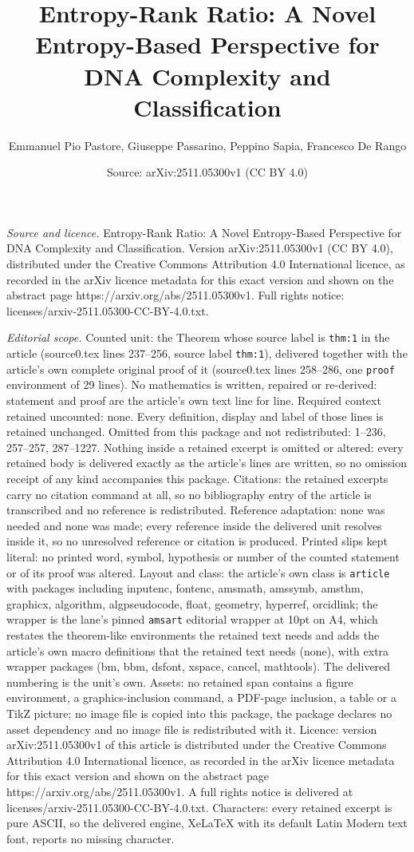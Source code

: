 \documentclass[10pt,a4paper]{amsart}
\title[Entropy-Rank Ratio: A Novel Entropy-Based Perspective for DN]{Entropy-Rank Ratio: A Novel Entropy-Based Perspective for DNA Complexity and Classification}
\author{Emmanuel Pio Pastore, Giuseppe Passarino, Peppino Sapia, Francesco De Rango}
\date{Source: arXiv:2511.05300v1 (CC BY 4.0)}
\begin{document}
\maketitle

\noindent\emph{Source and licence.} Entropy-Rank Ratio: A Novel Entropy-Based Perspective for DNA Complexity and Classification. Version arXiv:2511.05300v1 (CC BY 4.0), distributed under the Creative Commons Attribution 4.0 International licence, as recorded in the arXiv licence metadata for this exact version and shown on the abstract page https://arxiv.org/abs/2511.05300v1. Full rights notice: licenses/arxiv-2511.05300-CC-BY-4.0.txt.\par\smallskip

\noindent\textit{Editorial scope.} Counted unit: the Theorem whose source label is \texttt{thm:1} in the article (source0.tex lines 237--256, source label \texttt{thm:1}), delivered together with the article's own complete original proof of it (source0.tex lines 258--286, one \texttt{proof} environment of 29 lines). No mathematics is written, repaired or re-derived: statement and proof are the article's own text line for line. Required context retained uncounted: none. Every definition, display and label of those lines is retained unchanged. Omitted from this package and not redistributed: 1--236, 257--257, 287--1227. Nothing inside a retained excerpt is omitted or altered: every retained body is delivered exactly as the article's lines are written, so no omission receipt of any kind accompanies this package. Citations: the retained excerpts carry no citation command at all, so no bibliography entry of the article is transcribed and no reference is redistributed. Reference adaptation: none was needed and none was made; every reference inside the delivered unit resolves inside it, so no unresolved reference or citation is produced. Printed slips kept literal: no printed word, symbol, hypothesis or number of the counted statement or of its proof was altered. Layout and class: the article's own class is \texttt{article} with packages including inputenc, fontenc, amsmath, amssymb, amsthm, graphicx, algorithm, algpseudocode, float, geometry, hyperref, orcidlink; the wrapper is the lane's pinned \texttt{amsart} editorial wrapper at 10pt on A4, which restates the theorem-like environments the retained text needs and adds the article's own macro definitions that the retained text needs (none), with extra wrapper packages (bm, bbm, dsfont, xspace, cancel, mathtools). The delivered numbering is the unit's own. Assets: no retained span contains a figure environment, a graphics-inclusion command, a PDF-page inclusion, a table or a TikZ picture; no image file is copied into this package, the package declares no asset dependency and no image file is redistributed with it. Licence: version arXiv:2511.05300v1 of this article is distributed under the Creative Commons Attribution 4.0 International licence, as recorded in the arXiv licence metadata for this exact version and shown on the abstract page https://arxiv.org/abs/2511.05300v1. A full rights notice is delivered at licenses/arxiv-2511.05300-CC-BY-4.0.txt. Characters: every retained excerpt is pure ASCII, so the delivered engine, XeLaTeX with its default Latin Modern text font, reports no missing character.
\end{document}
